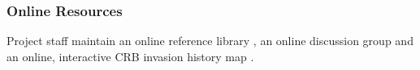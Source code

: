 \documentclass[12pt,letterpaper,english,bibliography=totocnumbered,abstract=on]{scrartcl}
\begin{document}
\subsubsection{Online Resources}

Project staff maintain an online reference library \cite{mooreOnlineReferenceLibrary2021}, an online discussion group \cite{mooreOnlineEmailDiscussion2021} and an online, interactive CRB invasion history map \cite{moore_web_2019}.

%
%
%
%
%
\end{document}

